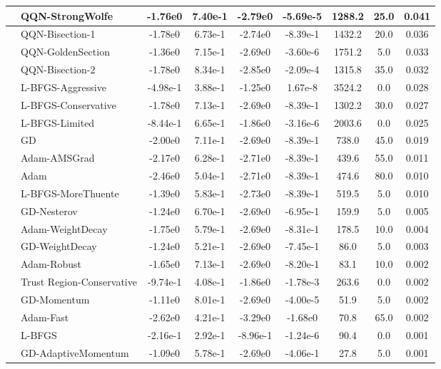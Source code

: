 \documentclass{article}
\begin{document}
\begin{longtable}{|l|l|c|c|c|c|c|c|c|}
\hline
 & QQN-StrongWolfe & -1.76e0 & 7.40e-1 & -2.79e0 & -5.69e-5 & 1288.2 & 25.0 & 0.041 \\
\hline
 & QQN-Bisection-1 & -1.78e0 & 6.73e-1 & -2.74e0 & -8.39e-1 & 1432.2 & 20.0 & 0.036 \\
\hline
 & QQN-GoldenSection & -1.36e0 & 7.15e-1 & -2.69e0 & -3.60e-6 & 1751.2 & 5.0 & 0.033 \\
\hline
 & QQN-Bisection-2 & -1.78e0 & 8.34e-1 & -2.85e0 & -2.09e-4 & 1315.8 & 35.0 & 0.032 \\
\hline
 & L-BFGS-Aggressive & -4.98e-1 & 3.88e-1 & -1.25e0 & 1.67e-8 & 3524.2 & 0.0 & 0.028 \\
\hline
 & L-BFGS-Conservative & -1.78e0 & 7.13e-1 & -2.69e0 & -8.39e-1 & 1302.2 & 30.0 & 0.027 \\
\hline
 & L-BFGS-Limited & -8.44e-1 & 6.65e-1 & -1.86e0 & -3.16e-6 & 2003.6 & 0.0 & 0.025 \\
\hline
 & GD & -2.00e0 & 7.11e-1 & -2.69e0 & -8.39e-1 & 738.0 & 45.0 & 0.019 \\
\hline
 & Adam-AMSGrad & -2.17e0 & 6.28e-1 & -2.71e0 & -8.39e-1 & 439.6 & 55.0 & 0.011 \\
\hline
 & Adam & -2.46e0 & 5.04e-1 & -2.71e0 & -8.39e-1 & 474.6 & 80.0 & 0.010 \\
\hline
 & L-BFGS-MoreThuente & -1.39e0 & 5.83e-1 & -2.73e0 & -8.39e-1 & 519.5 & 5.0 & 0.010 \\
\hline
 & GD-Nesterov & -1.24e0 & 6.70e-1 & -2.69e0 & -6.95e-1 & 159.9 & 5.0 & 0.005 \\
\hline
 & Adam-WeightDecay & -1.75e0 & 5.79e-1 & -2.69e0 & -8.31e-1 & 178.5 & 10.0 & 0.004 \\
\hline
 & GD-WeightDecay & -1.24e0 & 5.21e-1 & -2.69e0 & -7.45e-1 & 86.0 & 5.0 & 0.003 \\
\hline
 & Adam-Robust & -1.65e0 & 7.13e-1 & -2.69e0 & -8.20e-1 & 83.1 & 10.0 & 0.002 \\
\hline
 & Trust Region-Conservative & -9.74e-1 & 4.08e-1 & -1.86e0 & -1.78e-3 & 263.6 & 0.0 & 0.002 \\
\hline
 & GD-Momentum & -1.11e0 & 8.01e-1 & -2.69e0 & -4.00e-5 & 51.9 & 5.0 & 0.002 \\
\hline
 & Adam-Fast & -2.62e0 & 4.21e-1 & -3.29e0 & -1.68e0 & 70.8 & 65.0 & 0.002 \\
\hline
 & L-BFGS & -2.16e-1 & 2.92e-1 & -8.96e-1 & -1.24e-6 & 90.4 & 0.0 & 0.001 \\
\hline
 & GD-AdaptiveMomentum & -1.09e0 & 5.78e-1 & -2.69e0 & -4.06e-1 & 27.8 & 5.0 & 0.001 \\

\end{longtable}
\end{document}
